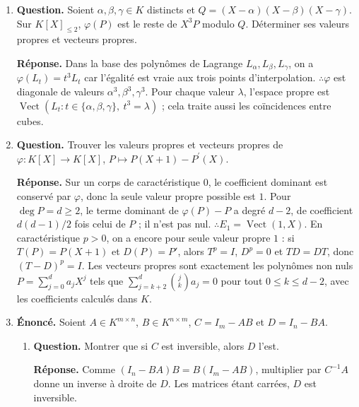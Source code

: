 \documentclass[12pt, a4paper]{article}
\begin{document}
\begin{enumerate}[label=9.\arabic*., start=94]
  \item \begin{minipage}[t]{\linewidth}\raggedright
\textbf{Question.} Soient $\alpha,\beta,\gamma\in K$ distincts et $Q=(X-\alpha)(X-\beta)(X-\gamma)$. Sur $K[X]_{\leq2}$, $\varphi(P)$ est le reste de $X^3P$ modulo $Q$. Déterminer ses valeurs propres et vecteurs propres.
\par\smallskip
\textbf{Réponse.} Dans la base des polynômes de Lagrange $L_\alpha,L_\beta,L_\gamma$, on a
    $\varphi(L_t)=t^3L_t$ car l'égalité est vraie aux trois points d'interpolation.
    $\therefore\varphi$ est diagonale de valeurs $\alpha^3,\beta^3,\gamma^3$.
    Pour chaque valeur $\lambda$, l'espace propre est
    $\operatorname{Vect}(L_t:t\in\{\alpha,\beta,\gamma\},\ t^3=\lambda)$ ; cela traite aussi les coïncidences entre cubes.
\end{minipage}

  \item \begin{minipage}[t]{\linewidth}\raggedright
\textbf{Question.} Trouver les valeurs propres et vecteurs propres de $\varphi:K[X]\to K[X]$, $P\mapsto P(X+1)-P^{\prime}(X)$.
\par\smallskip
\textbf{Réponse.} Sur un corps de caractéristique $0$, le coefficient dominant est conservé par $\varphi$, donc la seule valeur propre possible est $1$.
    Pour $\deg P=d\geq2$, le terme dominant de $\varphi(P)-P$ a degré $d-2$, de coefficient $d(d-1)/2$ fois celui de $P$ ; il n'est pas nul.
    $\therefore E_1=\operatorname{Vect}(1,X)$.
    En caractéristique $p>0$, on a encore pour seule valeur propre $1$ : si $T(P)=P(X+1)$ et $D(P)=P'$, alors $T^p=I$, $D^p=0$ et $TD=DT$, donc $(T-D)^p=I$.
    Les vecteurs propres sont exactement les polynômes non nuls $P=\sum_{j=0}^da_jX^j$ tels que
    $\sum_{j=k+2}^d\binom jk a_j=0$ pour tout $0\leq k\leq d-2$, avec les coefficients calculés dans $K$.
\end{minipage}

  \item \begin{minipage}[t]{\linewidth}\raggedright
\textbf{Énoncé.} Soient $A\in K^{m\times n}$, $B\in K^{n\times m}$, $C=I_m-AB$ et $D=I_n-BA$.

\begin{enumerate}[\arabic*.]
        \item \textbf{Question.} Montrer que si $C$ est inversible, alors $D$ l’est.
\par\smallskip
\textbf{Réponse.} Comme $(I_n-BA)B=B(I_m-AB)$, multiplier par $C^{-1}A$ donne un inverse à droite de $D$.
        Les matrices étant carrées, $D$ est inversible.


\end{enumerate}
\end{minipage}
\end{enumerate}
\end{document}
